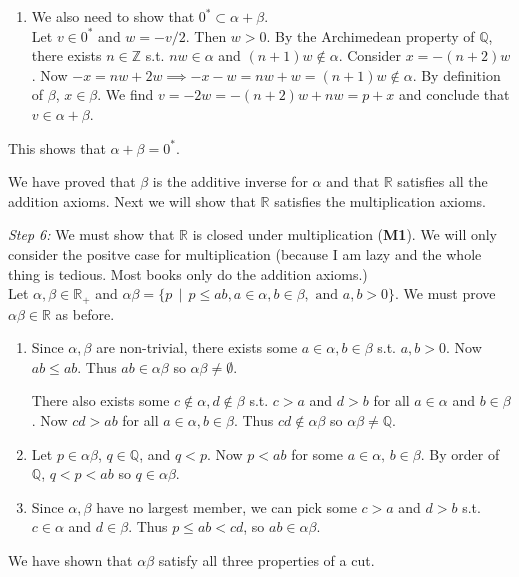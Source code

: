 \documentclass[../main.tex]{subfiles}
\begin{document}
\begin{enumerate}
\begin{enumerate}[label=\roman*.]
        \item We also need to show that \( 0^* \subset \alpha + \beta \). \\
        Let \( v \in 0^* \) and \( w = -v/2 \). Then \( w > 0 \).
        By the Archimedean property of \( \mathbb{Q} \), there exists \( n \in \mathbb{Z} \) s.t. \( nw \in \alpha \) and \( (n+1)w \notin \alpha \).
        Consider \( x = -(n+2)w \). Now \( -x = nw+2w \implies -x-w = nw+w = (n+1)w \notin \alpha \). By definition of \( \beta \), \( x \in \beta \).
        We find \( v = -2w = -(n+2)w + nw = p + x \) and conclude that \( v \in \alpha + \beta \).
    \end{enumerate}
    This shows that \( \alpha + \beta = 0^* \).
\end{enumerate}
We have proved that \( \beta \) is the additive inverse for \( \alpha \) and that \( \mathbb{R} \) satisfies all the addition axioms.
Next we will show that \( \mathbb{R} \) satisfies the multiplication axioms.

\emph{Step 6:} We must show that \( \mathbb{R} \) is closed under multiplication (\textbf{M1}).
We will only consider the positve case for multiplication (because I am lazy and the whole thing is tedious. Most books only do the addition axioms.)\\
Let \( \alpha, \beta \in \mathbb{R}_+ \) and \( \alpha\beta = \{ p \, \mid \, p \leq ab, a \in \alpha, b \in \beta, \text{ and } a,b > 0 \} \).
We must prove \( \alpha\beta \in \mathbb{R} \) as before.
\begin{enumerate}[label=\roman*.]
    \item Since \( \alpha, \beta \) are non-trivial, there exists some \( a \in \alpha, b \in \beta \) s.t. \( a, b > 0 \).
    Now \( ab \leq ab \). Thus \( ab \in \alpha\beta \) so \( \alpha\beta \neq \emptyset \).

    There also exists some \( c \notin \alpha, d \notin \beta \) s.t. \( c>a \) and \( d>b \) for all \( a \in \alpha \) and \( b \in \beta \).
    Now \( cd > ab \) for all \( a \in \alpha, b \in \beta \). Thus \( cd \notin \alpha\beta \) so \( \alpha\beta \neq \mathbb{Q} \).

    \item Let \( p \in \alpha\beta \), \( q \in \mathbb{Q} \), and \( q < p \). Now \( p < ab \) for some \( a \in \alpha, \, b \in \beta \).
    By order of \( \mathbb{Q} \), \( q < p < ab \) so \( q \in \alpha\beta \).

    \item Since \( \alpha,\beta \) have no largest member, we can pick some \( c > a \) and \( d > b \)
    s.t. \( c \in \alpha \) and \( d \in \beta \). Thus \( p \leq ab < cd \), so \( ab \in \alpha\beta \).
\end{enumerate}
We have shown that \( \alpha\beta \) satisfy all three properties of a cut.
\end{document}
